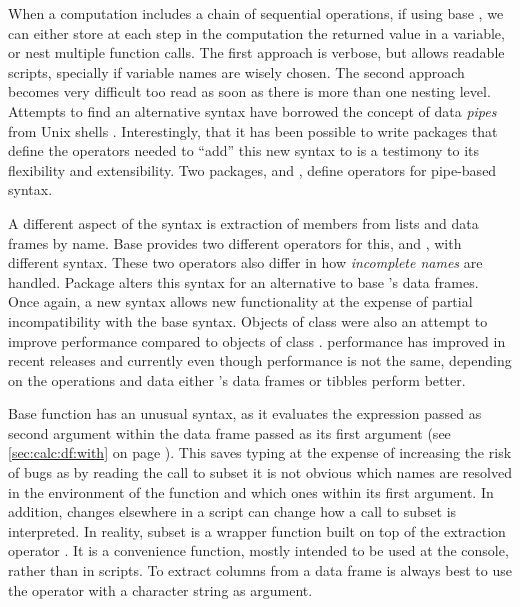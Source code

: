 \documentclass[krantz2]{krantz}\usepackage{knitr}%
\begin{document}
When a computation includes a chain of sequential operations, if using base \Rlang, we can either store at each step in the computation the returned value in a variable, or nest multiple function calls. The first approach is verbose, but allows readable scripts, specially if variable names are wisely chosen. The second approach becomes very difficult too read as soon as there is more than one nesting level. Attempts to find an alternative syntax have borrowed the concept of data \emph{pipes} from Unix shells \autocite{Kernigham1981}. Interestingly, that it has been possible to write packages that define the operators needed to ``add'' this new syntax to \Rlang is a testimony to its flexibility and extensibility. Two packages,  and , define operators for pipe-based syntax.

A different aspect of the \Rlang syntax is extraction of members from lists and data frames by name. Base \Rlang provides two different operators for this, \code{\$} and \code{[]}, with different syntax. These two operators also differ in how \emph{incomplete names} are handled. Package  alters this syntax for an alternative to base \Rlang's data frames. Once again, a new syntax allows new functionality at the expense of partial incompatibility with the base \Rlang syntax. Objects of class  were also an attempt to improve performance compared to objects of class . \Rlang performance has improved in recent releases and currently even though performance is not the same, depending on the operations and data either \Rlang's data frames or tibbles perform better.

Base \Rlang function  has an unusual syntax, as it evaluates the expression passed as second argument within the data frame passed as its first argument (see \ref{sec:calc:df:with} on page \pageref{sec:calc:df:with}). This saves typing at the expense of increasing the risk of bugs as by reading the call to subset it is not obvious which names are resolved in the environment of the function and which ones within its first argument. In addition, changes elsewhere in a script can change how a call to subset is interpreted. In reality, subset is a wrapper function built on top of the extraction operator \code{[]}. It is a convenience function, mostly intended to be used at the console, rather than in scripts. To extract columns from a data frame is always best to use the \code{[[]]} operator with a character string as argument.
\end{document}
